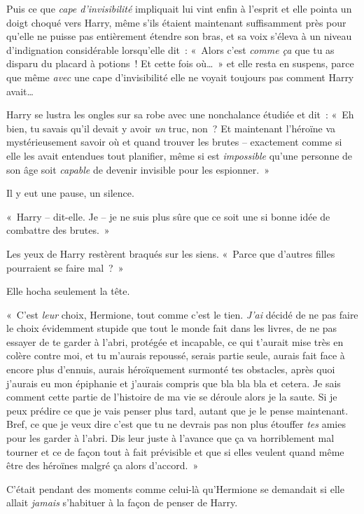 Puis ce que \emph{cape d'invisibilité} impliquait lui vint enfin à l'esprit et elle pointa un doigt choqué vers Harry, même s'ils étaient maintenant suffisamment près pour qu'elle ne puisse pas entièrement étendre son bras, et sa voix s'éleva à un niveau d'indignation considérable lorsqu'elle dit~: «~Alors c'est \emph{comme ça} que tu as disparu du placard à potions~! Et cette fois où…~» et elle resta en suspens, parce que même \emph{avec} une cape d'invisibilité elle ne voyait toujours pas comment Harry avait…

Harry se lustra les ongles sur sa robe avec une nonchalance étudiée et dit~: «~Eh bien, tu savais qu'il devait y avoir \emph{un} truc, non~? Et maintenant l'héroïne va mystérieusement savoir où et quand trouver les brutes -- exactement comme si elle les avait entendues tout planifier, même si est \emph{impossible} qu'une personne de son âge soit \emph{capable} de devenir invisible pour les espionner.~»

Il y eut une pause, un silence.

«~Harry -- dit-elle. Je -- je ne suis plus sûre que ce soit une si bonne idée de combattre des brutes.~»

Les yeux de Harry restèrent braqués sur les siens. «~Parce que d'autres filles pourraient se faire mal~?~»

Elle hocha seulement la tête.

«~C'est \emph{leur} choix, Hermione, tout comme c'est le tien. \emph{J'ai} décidé de ne pas faire le choix évidemment stupide que tout le monde fait dans les livres, de ne pas essayer de te garder à l'abri, protégée et incapable, ce qui t'aurait mise très en colère contre moi, et tu m'aurais repoussé, serais partie seule, aurais fait face à encore plus d'ennuis, aurais héroïquement surmonté tes obstacles, après quoi j'aurais eu mon épiphanie et j'aurais compris que bla bla bla et cetera. Je sais comment cette partie de l'histoire de ma vie se déroule alors je la saute. Si je peux prédire ce que je vais penser plus tard, autant que je le pense maintenant. Bref, ce que je veux dire c'est que tu ne devrais pas non plus étouffer \emph{tes} amies pour les garder à l'abri. Dis leur juste à l'avance que ça va horriblement mal tourner et ce de façon tout à fait prévisible et que si elles veulent quand même être des héroïnes malgré ça alors d'accord.~»

C'était pendant des moments comme celui-là qu'Hermione se demandait si elle allait \emph{jamais} s'habituer à la façon de penser de Harry.


